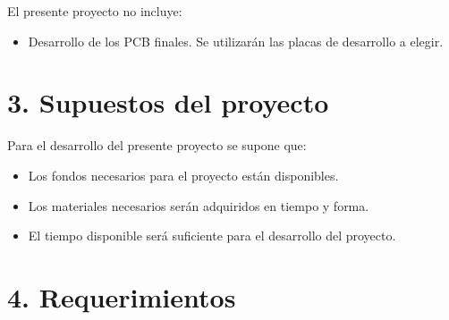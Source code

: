\documentclass[11pt]{charter}
\begin{document}
El presente proyecto no incluye:
\begin{itemize}
    \item Desarrollo de los PCB finales. Se utilizarán las placas de desarrollo a elegir.
\end{itemize}


\section{3. Supuestos del proyecto}
\label{sec:supuestos}
Para el desarrollo del presente proyecto se supone que:
\begin{itemize}
    \item Los fondos necesarios para el proyecto están disponibles.
    \item Los materiales necesarios serán adquiridos en tiempo y forma.
    \item El tiempo disponible será suficiente para el desarrollo del proyecto.
\end{itemize}


\section{4. Requerimientos}
\label{sec:requerimientos}
\end{document}
